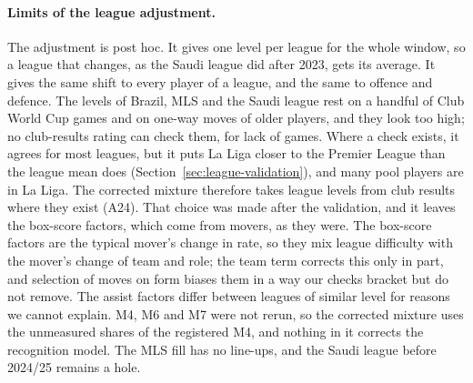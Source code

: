 \documentclass[11pt,a4paper]{article}
\begin{document}
\paragraph{Limits of the league adjustment.}
The adjustment is post hoc. It gives one level per league for the whole
window, so a league that changes, as the Saudi league did after 2023, gets
its average. It gives the same shift to every player of a league, and the same
to offence and defence. The levels of Brazil, MLS and the Saudi league rest on
a handful of Club World Cup games and on one-way moves of older players, and
they look too high; no club-results rating can check them, for lack of games.
Where a check exists, it agrees for most leagues, but it puts La Liga closer
to the Premier League than the league mean does
(Section~\ref{sec:league-validation}), and many pool players are in La Liga.
The corrected mixture therefore takes league levels from club results where
they exist (A24). That choice was made after the validation, and it leaves the
box-score factors, which come from movers, as they were. The box-score factors
are the typical mover's change in rate, so they mix league difficulty with the
mover's change of team and role; the team term corrects this only in part, and
selection of moves on form biases them in a way our checks bracket but do not
remove. The assist factors differ between leagues of similar level for reasons
we cannot explain. M4, M6 and M7 were not rerun, so the corrected mixture uses
the unmeasured shares of the registered M4, and nothing in it corrects the
recognition model. The MLS fill has no line-ups, and the Saudi league before
2024/25 remains a hole.
\end{document}
